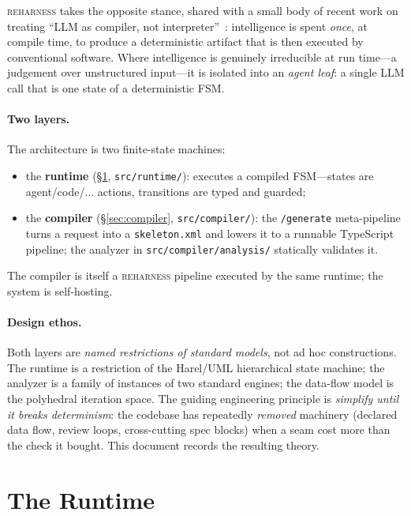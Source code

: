 \documentclass[11pt]{article}
\theoremstyle{plain}
\theoremstyle{definition}
\theoremstyle{remark}
\newcommand{\reharness}{\textsc{reharness}}
\newcommand{\code}[1]{\texttt{#1}}
\begin{document}
\reharness{} takes the opposite stance, shared with a small body of recent work
on treating ``LLM as compiler, not interpreter''~\cite{dspy,llmp,compiledai}:
intelligence is spent
\emph{once}, at compile time, to produce a deterministic artifact that is then
executed by conventional software. Where intelligence is genuinely irreducible at
run time---a judgement over unstructured input---it is isolated into an
\emph{agent leaf}: a single LLM call that is one state of a deterministic FSM.

\paragraph{Two layers.} The architecture is two finite-state machines:
\begin{itemize}[nosep]
  \item the \textbf{runtime} (\S\ref{sec:runtime}, \code{src/runtime/}): executes a
        compiled FSM---states are agent/code/$\dots$ actions, transitions are typed
        and guarded;
  \item the \textbf{compiler} (\S\ref{sec:compiler}, \code{src/compiler/}): the
        \code{/generate} meta-pipeline turns a request into a \code{skeleton.xml}
        and lowers it to a runnable TypeScript pipeline; the analyzer in
        \code{src/compiler/analysis/} statically validates it.
\end{itemize}
The compiler is itself a \reharness{} pipeline executed by the same runtime; the
system is self-hosting.

\paragraph{Design ethos.} Both layers are \emph{named restrictions of standard
models}, not ad hoc constructions. The runtime is a restriction of the
Harel/UML hierarchical state machine; the analyzer is a family of instances of two
standard engines; the data-flow model is the polyhedral iteration space. The
guiding engineering principle is \emph{simplify until it breaks determinism}: the
codebase has repeatedly \emph{removed} machinery (declared data flow, review loops,
cross-cutting spec blocks) when a seam cost more than the check it bought. This
document records the resulting theory.

\section{The Runtime}\label{sec:runtime}
\end{document}

